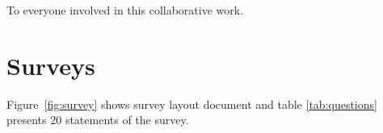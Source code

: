 \documentclass[sigconf,anonymous,review]{acmart}
\begin{document}
\begin{acks}
To everyone involved in this collaborative work.
\end{acks}



\appendix

\section{Surveys}
Figure~\ref{fig:survey} shows survey layout document and 
table \ref{tab:questions} presents 20 statements of the survey.
\end{document}
